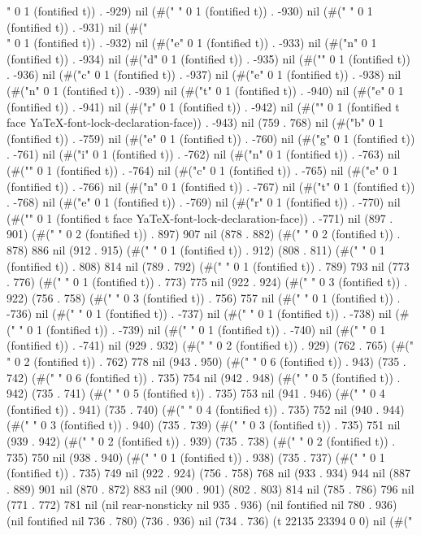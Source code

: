 " 0 1 (fontified t)) . -929) nil (#(" " 0 1 (fontified t)) . -930) nil (#(" " 0 1 (fontified t)) . -931) nil (#("\\" 0 1 (fontified t)) . -932) nil (#("e" 0 1 (fontified t)) . -933) nil (#("n" 0 1 (fontified t)) . -934) nil (#("d" 0 1 (fontified t)) . -935) nil (#("{" 0 1 (fontified t)) . -936) nil (#("c" 0 1 (fontified t)) . -937) nil (#("e" 0 1 (fontified t)) . -938) nil (#("n" 0 1 (fontified t)) . -939) nil (#("t" 0 1 (fontified t)) . -940) nil (#("e" 0 1 (fontified t)) . -941) nil (#("r" 0 1 (fontified t)) . -942) nil (#("}" 0 1 (fontified t face YaTeX-font-lock-declaration-face)) . -943) nil (759 . 768) nil (#("b" 0 1 (fontified t)) . -759) nil (#("e" 0 1 (fontified t)) . -760) nil (#("g" 0 1 (fontified t)) . -761) nil (#("i" 0 1 (fontified t)) . -762) nil (#("n" 0 1 (fontified t)) . -763) nil (#("{" 0 1 (fontified t)) . -764) nil (#("c" 0 1 (fontified t)) . -765) nil (#("e" 0 1 (fontified t)) . -766) nil (#("n" 0 1 (fontified t)) . -767) nil (#("t" 0 1 (fontified t)) . -768) nil (#("e" 0 1 (fontified t)) . -769) nil (#("r" 0 1 (fontified t)) . -770) nil (#("}" 0 1 (fontified t face YaTeX-font-lock-declaration-face)) . -771) nil (897 . 901) (#("  " 0 2 (fontified t)) . 897) 907 nil (878 . 882) (#("  " 0 2 (fontified t)) . 878) 886 nil (912 . 915) (#(" " 0 1 (fontified t)) . 912) (808 . 811) (#(" " 0 1 (fontified t)) . 808) 814 nil (789 . 792) (#(" " 0 1 (fontified t)) . 789) 793 nil (773 . 776) (#(" " 0 1 (fontified t)) . 773) 775 nil (922 . 924) (#("   " 0 3 (fontified t)) . 922) (756 . 758) (#("   " 0 3 (fontified t)) . 756) 757 nil (#(" " 0 1 (fontified t)) . -736) nil (#(" " 0 1 (fontified t)) . -737) nil (#(" " 0 1 (fontified t)) . -738) nil (#(" " 0 1 (fontified t)) . -739) nil (#(" " 0 1 (fontified t)) . -740) nil (#(" " 0 1 (fontified t)) . -741) nil (929 . 932) (#("  " 0 2 (fontified t)) . 929) (762 . 765) (#("  " 0 2 (fontified t)) . 762) 778 nil (943 . 950) (#("      " 0 6 (fontified t)) . 943) (735 . 742) (#("      " 0 6 (fontified t)) . 735) 754 nil (942 . 948) (#("     " 0 5 (fontified t)) . 942) (735 . 741) (#("     " 0 5 (fontified t)) . 735) 753 nil (941 . 946) (#("    " 0 4 (fontified t)) . 941) (735 . 740) (#("    " 0 4 (fontified t)) . 735) 752 nil (940 . 944) (#("   " 0 3 (fontified t)) . 940) (735 . 739) (#("   " 0 3 (fontified t)) . 735) 751 nil (939 . 942) (#("  " 0 2 (fontified t)) . 939) (735 . 738) (#("  " 0 2 (fontified t)) . 735) 750 nil (938 . 940) (#(" " 0 1 (fontified t)) . 938) (735 . 737) (#(" " 0 1 (fontified t)) . 735) 749 nil (922 . 924) (756 . 758) 768 nil (933 . 934) 944 nil (887 . 889) 901 nil (870 . 872) 883 nil (900 . 901) (802 . 803) 814 nil (785 . 786) 796 nil (771 . 772) 781 nil (nil rear-nonsticky nil 935 . 936) (nil fontified nil 780 . 936) (nil fontified nil 736 . 780) (736 . 936) nil (734 . 736) (t 22135 23394 0 0) nil (#("

